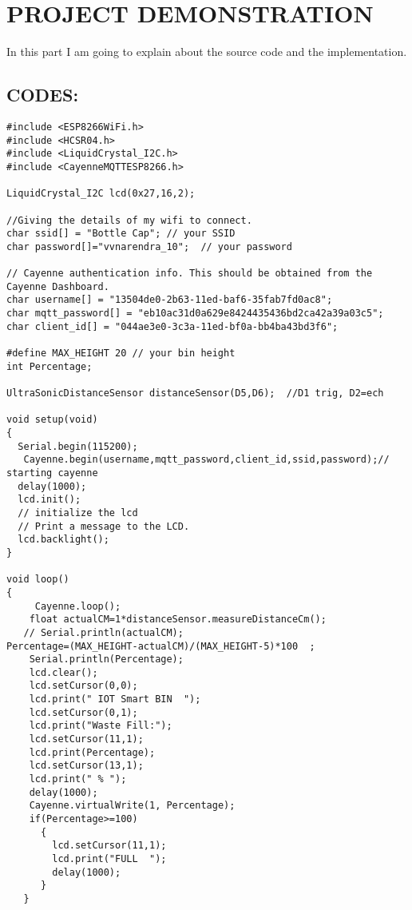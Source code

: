 \documentclass[12pt,letterpaper]{article}
\begin{document}
\newpage
\section{PROJECT DEMONSTRATION}
In this part I am going to explain about the source code and the implementation.
\subsection{CODES:}
\begin{lstlisting}
#include <ESP8266WiFi.h>
#include <HCSR04.h>
#include <LiquidCrystal_I2C.h>
#include <CayenneMQTTESP8266.h>

LiquidCrystal_I2C lcd(0x27,16,2);

//Giving the details of my wifi to connect.
char ssid[] = "Bottle Cap"; // your SSID
char password[]="vvnarendra_10";  // your password

// Cayenne authentication info. This should be obtained from the Cayenne Dashboard.
char username[] = "13504de0-2b63-11ed-baf6-35fab7fd0ac8";
char mqtt_password[] = "eb10ac31d0a629e8424435436bd2ca42a39a03c5";
char client_id[] = "044ae3e0-3c3a-11ed-bf0a-bb4ba43bd3f6";

#define MAX_HEIGHT 20 // your bin height
int Percentage;

UltraSonicDistanceSensor distanceSensor(D5,D6);  //D1 trig, D2=ech

void setup(void)
{
  Serial.begin(115200);
   Cayenne.begin(username,mqtt_password,client_id,ssid,password);// starting cayenne 
  delay(1000);
  lcd.init();                      
  // initialize the lcd 
  // Print a message to the LCD.
  lcd.backlight();
}

void loop()
{
     Cayenne.loop();
    float actualCM=1*distanceSensor.measureDistanceCm();    
   // Serial.println(actualCM); 
Percentage=(MAX_HEIGHT-actualCM)/(MAX_HEIGHT-5)*100  ;
    Serial.println(Percentage);
    lcd.clear();
    lcd.setCursor(0,0);
    lcd.print(" IOT Smart BIN  ");
    lcd.setCursor(0,1);
    lcd.print("Waste Fill:");
    lcd.setCursor(11,1);
    lcd.print(Percentage);
    lcd.setCursor(13,1);
    lcd.print(" % ");
    delay(1000);
    Cayenne.virtualWrite(1, Percentage);
    if(Percentage>=100)
      { 
        lcd.setCursor(11,1);
        lcd.print("FULL  ");             
        delay(1000);
      }      
   }

\end{lstlisting}
\end{document}
